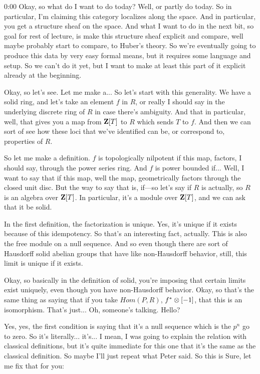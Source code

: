\begin{unfinished}{0:00}
Okay, so what do I want to do today? Well, or partly do today. So in particular, I'm claiming this category localizes along the space. And in particular, you get a structure sheaf on the space. And what I want to do in the next bit, so goal for rest of lecture, is make this structure sheaf explicit and compare, well maybe probably start to compare, to Huber's theory. So we're eventually going to produce this data by very easy formal means, but it requires some language and setup. So we can't do it yet, but I want to make at least this part of it explicit already at the beginning.

Okay, so let's see. Let me make a... So let's start with this generality. We have a solid ring, and let's take an element $f$ in $R$, or really I should say in the underlying discrete ring of $R$ in case there's ambiguity. And that in particular, well, that gives you a map from $\mathbf Z[T]$ to $R$ which sends $T$ to $f$. And then we can sort of see how these loci that we've identified can be, or correspond to, properties of $R$.

So let me make a definition. $f$ is topologically nilpotent if this map, factors, I should say, through the power series ring. And $f$ is power bounded if... Well, I want to say that if this map, well the map, geometrically factors through the closed unit disc. But the way to say that is, if---so let's say if $R$ is actually, so $R$ is an algebra over $\mathbf Z[T]$. In particular, it's a module over $\mathbf Z[T]$, and we can ask that it be solid.

In the first definition, the factorization is unique. Yes, it's unique if it exists because of this idempotency. So that's an interesting fact, actually. This is also the free module on a null sequence. And so even though there are sort of Hausdorff solid abelian groups that have like non-Hausdorff behavior, still, this limit is unique if it exists.

Okay, so basically in the definition of solid, you're imposing that certain limits exist uniquely, even though you have non-Hausdorff behavior. Okay, so that's the same thing as saying that if you take $Hom(P, R)$, $f^* \otimes [-1]$, that this is an isomorphism. That's just... Oh, someone's talking. Hello?

Yes, yes, the first condition is saying that it's a null sequence which is the $p^n$ go to zero. So it's literally... it's... I mean, I was going to explain the relation with classical definitions, but it's quite immediate for this one that it's the same as the classical definition. So maybe I'll just repeat what Peter said. So this is
Sure, let me fix that for you:


\end{unfinished}
